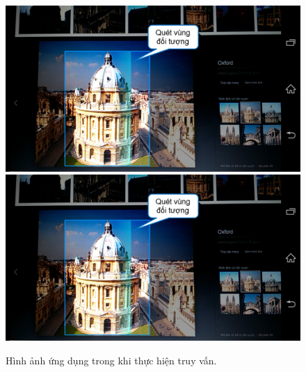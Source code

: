 {\begin{figure}[!htbp]
  \begin{center}
    \leavevmode
    \ifpdf
      \includegraphics[scale=0.17]{interface_2}
    \else
      \includegraphics[scale=0.17]{interface_2}
    \fi
    \caption[Hình ảnh ứng dụng trong khi thực hiện truy vấn. Trong khi chờ kết quả xử lý từ server, ứng dụng sẽ quét trên vùng đối tượng đã chọn để tạo cảm giác hứng thú cho người dùng. Tương tự khi chọn một hình ảnh trong thiết bị để truy vấn, ứng dụng cũng quét trên toàn bộ vùng truy vấn.]{Hình ảnh ứng dụng trong khi thực hiện truy vấn.}
    \label{FigChooseRegion}
  \end{center}
\end{figure}

}
